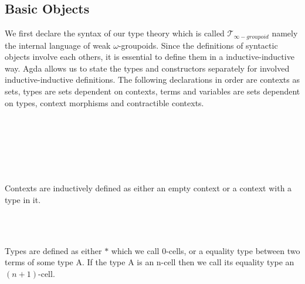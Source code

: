 \documentclass{acm_proc_article-sp}
\newcommand{\wog}{weak $\omega$-groupoids}
\newcommand{\tig}{$\mathcal{T}_{\infty-groupoid}$}
\begin{document}
\subsection{Basic Objects}

We first declare the syntax of our type theory which is
called \tig{} namely the internal language of \wog. Since the definitions of syntactic objects involve each others, it is essential to define them in a inductive-inductive way. Agda allows us to state the types and constructors separately for involved inductive-inductive definitions. The following declarations in order are contexts as sets,
types are sets dependent on contexts, terms and variables are sets
dependent on types, context morphisms and contractible contexts.

\begin{code}%
\>  \<[19]%
\>[19]\AgdaSymbol{:} \<%
\\
\>  \AgdaSymbol{(} \AgdaSymbol{:} \AgdaSymbol{)} \<[19]%
\>[19]\AgdaSymbol{:} \<%
\\
\>  \<[19]%
\>[19]\AgdaSymbol{:} \AgdaSymbol{\{} \AgdaSymbol{:} \AgdaSymbol{\}(} \AgdaSymbol{:}  \AgdaSymbol{)}  \<%
\\
\>  \<[19]%
\>[19]\AgdaSymbol{:} \AgdaSymbol{\{} \AgdaSymbol{:} \AgdaSymbol{\}(} \AgdaSymbol{:}  \AgdaSymbol{)}  \<%
\\
\>  \<[19]%
\>[19]\AgdaSymbol{:}     \<%
\\
\>  \<[19]%
\>[19]\AgdaSymbol{:}   \<%
\end{code}
Contexts are inductively defined as either an empty context or
a context with a type in it.

\begin{code}%
\>  \<%
\\
\>[0]\<[2]%
\>[2] \<[8]%
\>[8]\AgdaSymbol{:} \<%
\\
\>[0]\<[2]%
\>[2]\AgdaInductiveConstructor{\_,\_} \<[8]%
\>[8]\AgdaSymbol{:} \AgdaSymbol{(} \AgdaSymbol{:} \AgdaSymbol{)(} \AgdaSymbol{:}  \AgdaSymbol{)}  \<%
\end{code}
Types are defined as either $*$ which we
call 0-cells, or a equality type between two terms of some type A. If the
type A is an n-cell then we call its equality type an $(n+1)$-cell.
\end{document}
